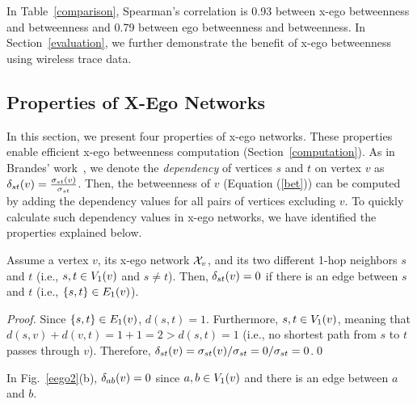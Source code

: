In Table~\ref{comparison}, Spearman's correlation is 0.93 between x-ego betweenness and betweenness and 0.79 between ego betweenness and betweenness.
In Section~\ref{evaluation}, we further demonstrate the benefit of x-ego betweenness using wireless trace data.
\subsection{Properties of X-Ego Networks}\label{x-go_properties}
In this section, we present four properties of x-ego networks. 
These properties enable efficient x-ego betweenness computation (Section~\ref{computation}). 
As in Brandes' work~\cite{Brandes01afaster}, we denote the \emph{dependency} of vertices $s$ and $t$ on vertex $v$ as $\D{s}{t}{v} = \frac{\sigma_{st}(v)}{\sigma_{st}}$.
Then, the betweenness of $v$ (Equation (\ref{bet})) can be computed by adding the dependency values for all pairs of vertices excluding $v$.
To quickly calculate such dependency values in x-ego networks, we have identified the properties explained below. 
\begin{theorem}
\label{theorem1} 
Assume a vertex $v$, its x-ego network $\XN{v}$, and its two different 1-hop neighbors $s$ and $t$ (i.e., $s, t \in \V{v}{1}$ and $s \ne t$).
Then, $\D{s}{t}{v} = 0$ if there is an edge between $s$ and $t$ (i.e., $\{s, t\} \in \E{v}{1}$).
\begin{proof}
Since $\{s, t\} \in \E{v}{1}$, $d(s, t) = 1$.
Furthermore, $s, t \in \V{v}{1}$, meaning that $d(s, v) + d(v, t) = 1 + 1 = 2 > d(s, t) = 1$ (i.e., no shortest path from $s$ to $t$ passes through $v$).
Therefore, $\D{s}{t}{v} = \sigma_{st}(v)/\sigma_{st} = 0/\sigma_{st} = 0$.\hfill\qed
\end{proof}
\end{theorem}
\begin{example}
In Fig.~\ref{eego2}(b), $\D{a}{b}{v} = 0$ since $a, b \in \V{v}{1}$ and there is an edge between $a$ and $b$.
\end{example}

